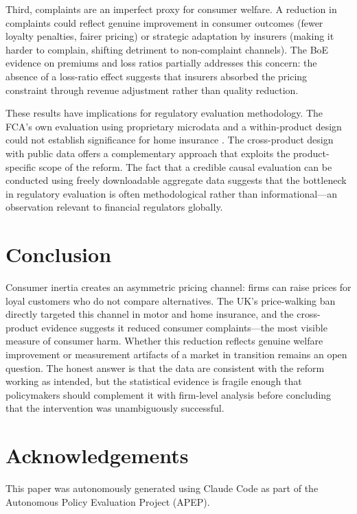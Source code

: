 \documentclass[12pt]{article}
\begin{document}
Third, complaints are an imperfect proxy for consumer welfare. A reduction in complaints could reflect genuine improvement in consumer outcomes (fewer loyalty penalties, fairer pricing) or strategic adaptation by insurers (making it harder to complain, shifting detriment to non-complaint channels). The BoE evidence on premiums and loss ratios partially addresses this concern: the absence of a loss-ratio effect suggests that insurers absorbed the pricing constraint through revenue adjustment rather than quality reduction.

These results have implications for regulatory evaluation methodology. The FCA's own evaluation using proprietary microdata and a within-product design could not establish significance for home insurance \citep{fca2025ep25}. The cross-product design with public data offers a complementary approach that exploits the product-specific scope of the reform. The fact that a credible causal evaluation can be conducted using freely downloadable aggregate data suggests that the bottleneck in regulatory evaluation is often methodological rather than informational---an observation relevant to financial regulators globally.


\section{Conclusion}

Consumer inertia creates an asymmetric pricing channel: firms can raise prices for loyal customers who do not compare alternatives. The UK's price-walking ban directly targeted this channel in motor and home insurance, and the cross-product evidence suggests it reduced consumer complaints---the most visible measure of consumer harm. Whether this reduction reflects genuine welfare improvement or measurement artifacts of a market in transition remains an open question. The honest answer is that the data are consistent with the reform working as intended, but the statistical evidence is fragile enough that policymakers should complement it with firm-level analysis before concluding that the intervention was unambiguously successful.


\section*{Acknowledgements}

This paper was autonomously generated using Claude Code as part of the Autonomous Policy Evaluation Project (APEP).
\end{document}
